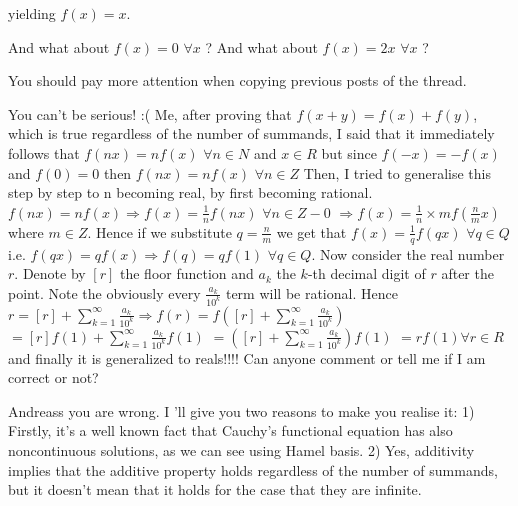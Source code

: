 \begin{mysolution}
	\begin{tcolorbox}
yielding $f(x)=x$.\end{tcolorbox}

And what about $f(x)=0$ $\forall x$ ?
And what about $f(x)=2x$ $\forall x$ ?

You should pay more attention when copying previous posts of the thread.
\end{mysolution}



\begin{mysolution}
	You can't be serious! :(
Me, after proving that $f(x+y)=f(x)+f(y)$, which is true regardless of the number of summands, I said that it immediately follows that $f(nx)=nf(x)$ $\forall n \in N $ and $x \in R$ but since $f(-x)=-f(x)$ and $f(0)=0$ then $f(nx)=nf(x)$ $\forall n \in Z$
Then, I tried to generalise this step by step to n becoming real, by first becoming rational.
$f(nx)=nf(x) \Rightarrow f(x)=\frac{1}{n}f(nx)$ $\forall n\in Z-{0}$ $\Rightarrow f(x)=\frac{1}{n}\times mf(\frac{n}{m}x)$ where $m \in Z$. Hence if we substitute $q=\frac{n}{m}$ we get that $f(x)=\frac{1}{q} f(qx)$ $\forall q \in Q$ i.e. $f(qx)=qf(x) \Rightarrow f(q)=qf(1)$ $\forall q \in Q$.
Now consider the real number $r$. Denote by $[r]$ the floor function and $a_k$ the $k$-th decimal digit of $r$ after the point. Note the obviously every $\frac{a_k}{10^k}$ term will be rational. 
Hence $r=[r]+	\sum_{k=1}^{\infty}\frac{a_k}{10^k} \Rightarrow f(r)=f([r]+	\sum_{k=1}^{\infty}\frac{a_k}{10^k})$
$= [r]f(1)+\sum_{k=1}^{\infty}\frac{a_k}{10^k}f(1)$
$=([r]+\sum_{k=1}^{\infty}\frac{a_k}{10^k})f(1)$
$=rf(1)  \forall r \in R$ 
and finally it is generalized to reals!!!!
Can anyone comment or tell me if I am correct or not?
\end{mysolution}



\begin{mysolution}
	Andreass you are wrong. I 'll give you two reasons to make you realise it: 
1) Firstly, it's a well known fact that Cauchy's functional equation has also noncontinuous solutions, as we can see using Hamel basis.
2) Yes, additivity implies that the additive property holds regardless of the number of summands, but it doesn't mean that it holds for the case that they are infinite.
\end{mysolution}



